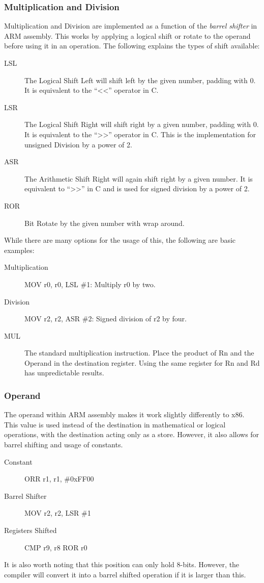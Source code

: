 			\subsubsection{Multiplication and Division}
				Multiplication and Division are implemented as a function of the \emph{barrel shifter} in ARM assembly.
				This works by applying a logical shift or rotate to the operand before using it in an operation.
				The following explains the types of shift available:
				\begin{description}
					\item[LSL] The Logical Shift Left will shift left by the given number, padding with 0.
						It is equivalent to the ``<<'' operator in C.
					\item[LSR] The Logical Shift Right will shift right by a given number, padding with 0.
						It is equivalent to the ``>>'' operator in C.
						This is the implementation for unsigned Division by a power of 2.
					\item[ASR] The Arithmetic Shift Right will again shift right by a given number.
						It is equivalent to ``>>'' in C and is used for signed division by a power of 2.
					\item[ROR] Bit Rotate by the given number with wrap around.
				\end{description}
				While there are many options for the usage of this, the following are basic examples:
				\begin{description}
					\item[Multiplication] MOV r0, r0, LSL \#1: Multiply r0 by two.
					\item[Division] MOV r2, r2, ASR \#2: Signed division of r2 by four.
					\item[MUL] The standard multiplication instruction.
						Place the product of Rn and the Operand in the destination register.
						Using the same register for Rn and Rd has unpredictable results.
				\end{description}

			\subsubsection{Operand}
				The operand within ARM assembly makes it work slightly differently to x86.
				This value is used instead of the destination in mathematical or logical operations, with the destination acting only as a store.
				However, it also allows for barrel shifting and usage of constants.
				\begin{description}
					\item[Constant] ORR r1, r1, \#0xFF00
					\item[Barrel Shifter] MOV r2, r2, LSR \#1
					\item[Registers Shifted] CMP r9, r8 ROR r0
				\end{description}
				It is also worth noting that this position can only hold 8-bits.
				However, the compiler will convert it into a barrel shifted operation if it is larger than this.

